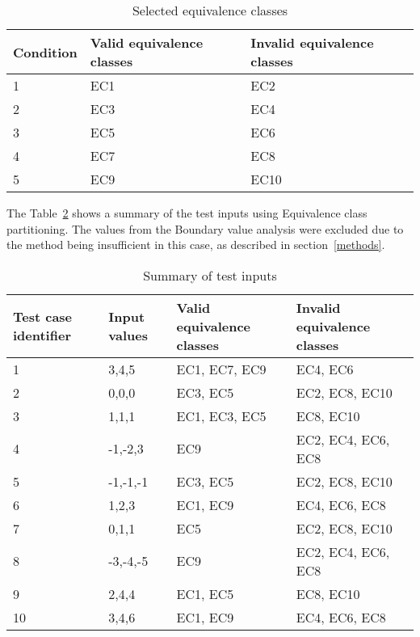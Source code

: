 \begin{table}[!htb]
	\centering
	\caption{Selected equivalence classes}
	\label{classestable}	
    \begin{tabular}{|l|l|l|}
        \hline
        Condition  & Valid equivalence classes & Invalid equivalence classes \\ \hline
        1          & EC1                       & EC2                         \\ 
        2          & EC3                       & EC4                         \\ 
        3          & EC5                       & EC6                         \\ 
        4          & EC7                       & EC8                         \\ 
        5          & EC9                       & EC10                        \\
        \hline
    \end{tabular}
\end{table}

\newpage

\noindent The Table~\ref{testinputtable} shows a summary of the test inputs using Equivalence class partitioning. The values from the Boundary value analysis were excluded due to the method being insufficient in this case, as described in section~\ref{methods}. 

\begin{table}[!htb]
	\centering
	\caption{Summary of test inputs}
	\label{testinputtable}

    \begin{tabular}{|l|l|l|l|}
        \hline
        Test case identifier & Input values & Valid equivalence classes      & Invalid equivalence classes         \\ \hline
        1                    & 3,4,5        & EC1, EC7, EC9 & EC4, EC6           \\ 
        2                    & 0,0,0        & EC3, EC5      & EC2, EC8, EC10     \\ 
        3                    & 1,1,1        & EC1, EC3, EC5 & EC8, EC10          \\ 
        4                    & -1,-2,3      & EC9           & EC2, EC4, EC6, EC8 \\ 
        5                    & -1,-1,-1     & EC3, EC5      & EC2, EC8, EC10     \\ 
        6                    & 1,2,3        & EC1, EC9      & EC4, EC6, EC8      \\ 
        7                    & 0,1,1        & EC5           & EC2, EC8, EC10     \\ 
        8                    & -3,-4,-5     & EC9           & EC2, EC4, EC6, EC8 \\ 
        9                    & 2,4,4        & EC1, EC5      & EC8, EC10          \\ 
        10                   & 3,4,6        & EC1, EC9      & EC4, EC6, EC8      \\
        \hline
    \end{tabular}
\end{table}






